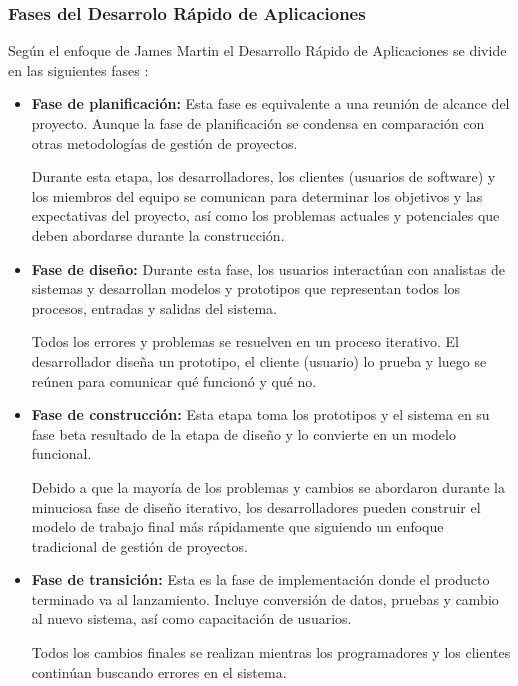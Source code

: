     \subsubsection{Fases del Desarrolo Rápido de Aplicaciones}

    Según el enfoque de James Martin el Desarrollo Rápido de Aplicaciones se divide en las siguientes fases \cite{RADJamesMartin}:

    \begin{itemize}
        \item \textbf{Fase de planificación:} Esta fase es equivalente a una reunión de alcance del proyecto. Aunque la fase de planificación se condensa en comparación con otras metodologías de gestión de proyectos.

        Durante esta etapa, los desarrolladores, los clientes (usuarios de software) y los miembros del equipo se comunican para determinar los objetivos y las expectativas del proyecto, así como los problemas actuales y potenciales que deben abordarse durante la construcción.

        \item \textbf{Fase de diseño:} Durante esta fase, los usuarios interactúan con analistas de sistemas y desarrollan modelos y prototipos que representan todos los procesos, entradas y salidas del sistema.
        
        Todos los errores y problemas se resuelven en un proceso iterativo. El desarrollador diseña un prototipo, el cliente (usuario) lo prueba y luego se reúnen para comunicar qué funcionó y qué no.
        
        \item \textbf{Fase de construcción:} Esta etapa toma los prototipos y el sistema en su fase beta resultado de la etapa de diseño y lo convierte en un modelo funcional.
        
        Debido a que la mayoría de los problemas y cambios se abordaron durante la minuciosa fase de diseño iterativo, los desarrolladores pueden construir el modelo de trabajo final más rápidamente que siguiendo un enfoque tradicional de gestión de proyectos.
        
        \item \textbf{Fase de transición:} Esta es la fase de implementación donde el producto terminado va al lanzamiento. Incluye conversión de datos, pruebas y cambio al nuevo sistema, así como capacitación de usuarios.

        Todos los cambios finales se realizan mientras los programadores y los clientes continúan buscando errores en el sistema.

    \end{itemize}





